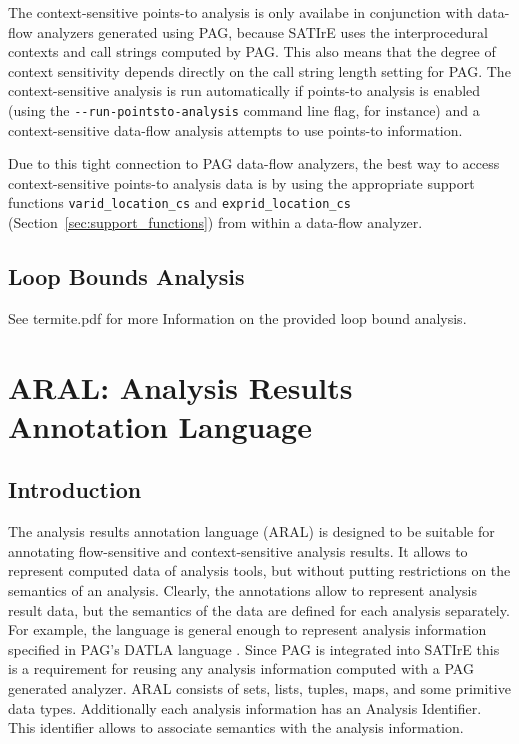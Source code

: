 \documentclass[a4paper,12pt]{report}
\begin{document}
The context-sensitive points-to analysis is only availabe in conjunction
with data-flow analyzers generated using PAG, because SATIrE uses the
interprocedural contexts and call strings computed by PAG. This also means
that the degree of context sensitivity depends directly on the call string
length setting for PAG. The context-sensitive analysis is run automatically
if points-to analysis is enabled (using the \verb|--run-pointsto-analysis|
command line flag, for instance) and a context-sensitive data-flow analysis
attempts to use points-to information.

Due to this tight connection to PAG data-flow analyzers, the best way to
access context-sensitive points-to analysis data is by using the appropriate
support functions \verb|varid_location_cs| and \verb|exprid_location_cs|
(Section~\ref{sec:support_functions}) from within a data-flow analyzer.

\section{Loop Bounds Analysis}
\label{sec:analysis_loopbounds}

See termite.pdf for more Information on the provided loop bound analysis.


\chapter{ARAL: Analysis Results Annotation Language}

\section{Introduction}
\label{section:aral}
The analysis results annotation language (ARAL) is designed to be suitable
for annotating flow-sensitive and context-sensitive analysis
results. It allows to represent computed data of analysis tools, but
without putting restrictions on the semantics of an analysis. Clearly,
the annotations allow to represent analysis result data, but the semantics of
the data are defined for each analysis separately. For example, the
language is general enough to represent analysis information specified
in PAG's DATLA language \cite{pag}. Since PAG is integrated into
SATIrE this is a requirement for reusing any analysis information
computed with a PAG generated analyzer. ARAL consists of sets, lists,
tuples, maps, and some primitive data types. Additionally each
analysis information has an Analysis Identifier. This identifier
allows to associate semantics with the analysis information.
\end{document}
